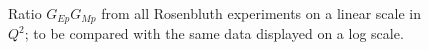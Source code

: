 \begin{figure}
\begin{center}
\caption{Ratio $G_{Ep}G_{Mp}$ from all Rosenbluth experiments on a linear scale in $Q^2$; to be compared with the same data displayed on a log scale.}
\label{fig:gepgd_lin}
\end{center}
\end{figure}


